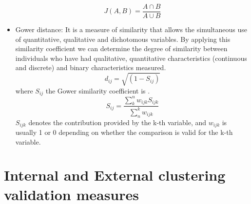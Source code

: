 \begin{itemize}
    \begin{equation}
        J(A,B) = \frac{A \cap B}{A \cup B}
    \end{equation}
    \item Gower distance: It is a measure of similarity that allows the simultaneous use of quantitative, qualitative and dichotomous variables. By applying this similarity coefficient we can determine the degree of similarity between individuals who have had qualitative, quantitative characteristics (continuous and discrete) and binary characteristics measured.
    \begin{equation}
        d_{ij}=\sqrt{(1-S_{ij})}
    \end{equation}
    where $S_{ij}$ the Gower similarity coefficient is \citep{R:olegas:2013}.
    \begin{equation}
        S_{ij}=\frac{\sum_{k}^{n}w_{ijk}S_{ijk}}{\sum_{n}^{k}w_{ijk}}
    \end{equation}
    $S_{ijk}$ denotes the contribution provided by the k-th variable, and $w_{ijk}$ is usually 1 or 0 depending on whether the comparison is valid for the k-th variable.
\end{itemize}

\section {Internal and External clustering validation measures} \label{sec:seccion2}

